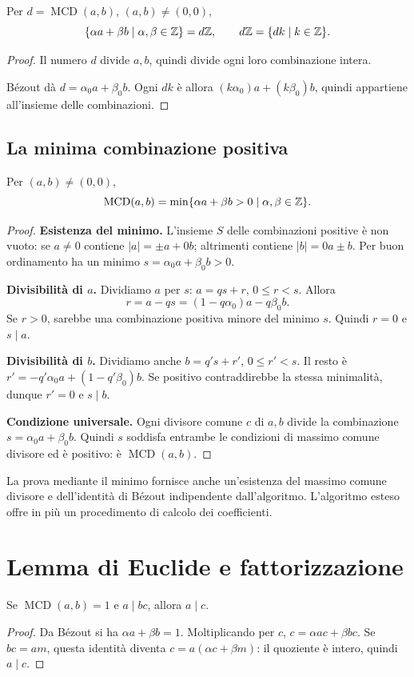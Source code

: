 \begin{corollario}
Per $d=\operatorname{MCD}(a,b)$, $(a,b)\ne(0,0)$,
\[
\{\alpha a+\beta b\mid\alpha,\beta\in\mathbb{Z}\}=d\mathbb{Z},
\qquad d\mathbb{Z}=\{dk\mid k\in\mathbb{Z}\}.
\]
\end{corollario}
\begin{proof}
\passomath{\subseteq} Il numero $d$ divide $a,b$, quindi divide ogni loro combinazione intera.

\passomath{\supseteq} Bézout dà $d=\alpha_0a+\beta_0b$. Ogni $dk$ è allora $(k\alpha_0)a+(k\beta_0)b$, quindi appartiene all'insieme delle combinazioni.
\end{proof}

\subsection{La minima combinazione positiva}
\begin{proposizione}\label{prop:min-combinazione}
Per $(a,b)\ne(0,0)$,
\[
\operatorname{MCD}(a,b)=\min\{\alpha a+\beta b>0\mid\alpha,\beta\in\mathbb{Z}\}.
\]
\end{proposizione}
\begin{proof}
\textbf{Esistenza del minimo.} L'insieme $S$ delle combinazioni positive è non vuoto: se $a\ne0$ contiene $|a|=\pm a+0b$; altrimenti contiene $|b|=0a\pm b$. Per buon ordinamento ha un minimo $s=\alpha_0a+\beta_0b>0$.

\textbf{Divisibilità di $a$.} Dividiamo $a$ per $s$: $a=qs+r$, $0\le r<s$. Allora
\[
r=a-qs=(1-q\alpha_0)a-q\beta_0b.
\]
Se $r>0$, sarebbe una combinazione positiva minore del minimo $s$. Quindi $r=0$ e $s\mid a$.

\textbf{Divisibilità di $b$.} Dividiamo anche $b=q's+r'$, $0\le r'<s$. Il resto è $r'=-q'\alpha_0a+(1-q'\beta_0)b$. Se positivo contraddirebbe la stessa minimalità, dunque $r'=0$ e $s\mid b$.

\textbf{Condizione universale.} Ogni divisore comune $c$ di $a,b$ divide la combinazione $s=\alpha_0a+\beta_0b$. Quindi $s$ soddisfa entrambe le condizioni di massimo comune divisore ed è positivo: è $\operatorname{MCD}(a,b)$.
\end{proof}

La prova mediante il minimo fornisce anche un'esistenza del massimo comune divisore e dell'identità di Bézout indipendente dall'algoritmo. L'algoritmo esteso offre in più un procedimento di calcolo dei coefficienti.

\section{Lemma di Euclide e fattorizzazione}
\begin{lemma}[Euclide]\label{lem:euclide}
Se $\operatorname{MCD}(a,b)=1$ e $a\mid bc$, allora $a\mid c$.
\end{lemma}
\begin{proof}
Da Bézout si ha $\alpha a+\beta b=1$. Moltiplicando per $c$, $c=\alpha ac+\beta bc$. Se $bc=am$, questa identità diventa $c=a(\alpha c+\beta m)$: il quoziente è intero, quindi $a\mid c$.
\end{proof}

